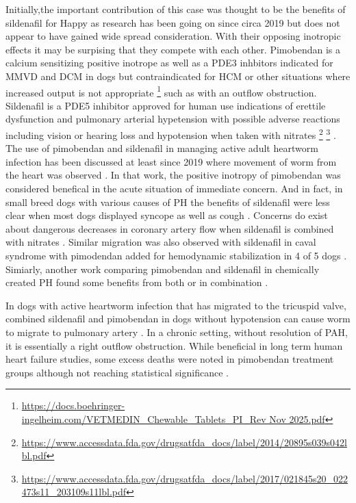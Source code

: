 Initially,the important contribution of this
case was thought to be the benefits of sildenafil for Happy as research
has been going on since circa 2019 but does not appear to
have gained wide spread consideration.
With their opposing inotropic effects it may be surpising that they
compete with each other.  
Pimobendan is a calcium sensitizing positive inotrope as 
well as a PDE3 inhbitors indicated for MMVD and  DCM in dogs but
contraindicated for HCM or other situations where increased output
is not appropriate 
\footnote{\url{https://docs.boehringer-ingelheim.com/VETMEDIN_Chewable_Tablets_PI_Rev Nov 2025.pdf}} such as with an outflow obstruction.
Sildenafil is a PDE5 inhibitor approved for human use indications of
erettile dysfunction and pulmonary arterial hypetension
with possible adverse reactions including vision or hearing loss
and hypotension when taken with nitrates
\footnote{\url{https://www.accessdata.fda.gov/drugsatfda_docs/label/2014/20895s039s042lbl.pdf}}
\footnote{\url{https://www.accessdata.fda.gov/drugsatfda_docs/label/2017/021845s20_022473s11_203109s11lbl.pdf}}
.
The use of pimobendan and sildenafil in managing active
adult heartworm infection has been discussed at least since 2019
where movement of worm from the heart was observed
\cite{Tjostheim_Kellihan_Grint_Effect_sildenafil_2019}. 
In that work, the positive inotropy of pimobendan was considered benefical
in the acute situation of immediate concern. 
And in fact, in small breed dogs with various causes of PH the benefits of 
sildenafil were less clear when most dogs displayed syncope as well
as cough  
\cite{Johnson_Stern_Clinical_features_outcome_2020}.
Concerns do exist about dangerous decreases in coronary artery
flow when sildenafil is combined with nitrates
\cite{Ishikura_Beppu_Hamada_Effects_Sildenafil_Citrate_2000}.
Similar migration was also observed with sildenafil in caval syndrome
with pimodendan added for hemodynamic stabilization in 4 of 5
dogs
\cite{Pariaut_Jung_Vila_Resolution_caval_syndrome_2020}.
Simiarly, another work comparing pimobendan and sildenafil in
chemically created PH found some benefits from both or in combination  
\cite{Nakata_Tanaka_Yoshiyuki_Effects_Single_Drug_2015}.




In dogs with active heartworm infection that has migrated to the
tricuspid valve, combined sildenafil and pimobendan 
in dogs without hypotension can cause worm to migrate to pulmonary artery
\cite{TJOSTHEIM201996}. 
In a chronic setting, without resolution of PAH, it is essentially
a right outflow obstruction. 
While beneficial in long term human heart failure studies, some 
excess deaths were noted in  pimobendan treatment groups although not reaching
statistical significance
\cite{Fuentes_pimobendan_2004}.

